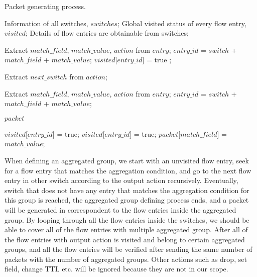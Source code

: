 \begin{algorithm}[htb]
  \caption{Packet generating process.}
  
  \begin{algorithmic}[1]
    \Require
      Information of all switches, $switches$;
      Global visited status of every flow entry, $visited$;
    \Ensure
      Details of flow entries are obtainable from switches;

          \State Extract $match\_field$, $match\_value$, $action$ from $entry$;
          \State $entry\_id$ = $switch$ + $match\_field$ + $match\_value$;
            \State $visited$[$entry\_id$] = true
            \EndIf
            \State {};
          \EndIf
      \EndFor
        \EndFor
    \EndFunction

      \State Extract $next\_switch$ from $action$;

        \State Extract $match\_field$, $match\_value$, $action$ from $entry$;
        \State $entry\_id$ = $switch$ + $match\_field$ + $match\_value$;
          
        \EndIf
      \EndFor
      \State \Return $packet$ 
    \EndFunction
  \end{algorithmic}

    \State $visited$[$entry\_id$] = true;
    \State $visited$[$entry\_id$] = true;
    \State $packet$[$match\_field$] = $match\_value$;
\end{algorithm}

When defining an aggregated group, we start with an unvisited flow entry, seek for a flow entry that matches the aggregation condition, and go to the next flow entry in other switch according to the output action recursively. Eventually, switch that does not have any entry that matches the aggregation condition for this group is reached, the aggregated group defining process ends, and a packet will be generated in correspondent to the flow entries inside the aggregated group. By looping through all the flow entries inside the switches, we should be able to cover all of the flow entries with multiple aggregated group. After all of the flow entries with output action is visited and belong to certain aggregated groups, and all the flow entries will be verified after sending the same number of packets with the number of aggregated groups. Other actions such as drop, set field, change TTL etc. will be ignored because they are not in our scope. 

